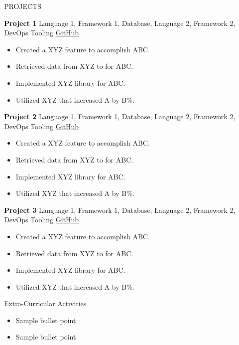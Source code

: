 \documentclass{resume} %
\begin{document}
	\begin{rSection}{PROJECTS}
		\vspace{-1.25em}
		\item \textbf{Project 1} {Language 1, Framework 1, Database, Language 2, Framework 2, DevOps Tooling} \hfill \href{www.github.com/GITHUBURL}{GitHub}
		\begin{itemize}
			\itemsep -3pt {} 
			\item Created a XYZ feature to accomplish ABC.
			\item Retrieved data from XYZ to for ABC.
			\item Implemented XYZ library for ABC.
			\item Utilized XYZ that increased A by B\%.
		\end{itemize}
		\item \textbf{Project 2} {Language 1, Framework 1, Database, Language 2, Framework 2, DevOps Tooling} \hfill \href{www.github.com/GITHUBURL}{GitHub}
		\begin{itemize}
			\itemsep -3pt {} 
			\item Created a XYZ feature to accomplish ABC.
			\item Retrieved data from XYZ to for ABC.
			\item Implemented XYZ library for ABC.
			\item Utilized XYZ that increased A by B\%.
		\end{itemize}
		\item \textbf{Project 3} {Language 1, Framework 1, Database, Language 2, Framework 2, DevOps Tooling} \hfill \href{www.github.com/GITHUBURL}{GitHub}
		\begin{itemize}
			\itemsep -3pt {} 
			\item Created a XYZ feature to accomplish ABC.
			\item Retrieved data from XYZ to for ABC.
			\item Implemented XYZ library for ABC.
			\item Utilized XYZ that increased A by B\%.
		\end{itemize}
	\end{rSection} 
	
	\begin{rSection}{Extra-Curricular Activities} 
		\begin{itemize}
			\item 	Sample bullet point.
			\item	Sample bullet point.
		\end{itemize}
		
		
	\end{rSection}
	
\end{document}
